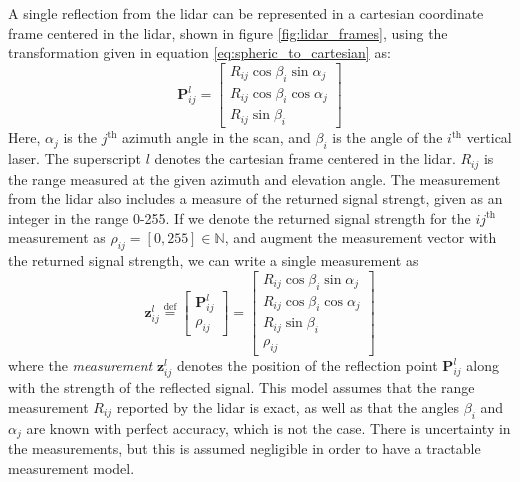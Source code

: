 A single reflection from the lidar can be represented in a cartesian coordinate frame centered in the lidar, shown in figure \ref{fig:lidar_frames}, using the transformation given in equation \ref{eq:spheric_to_cartesian} as:
\begin{equation}
\mathbf{P}^{l}_{ij}=\begin{bmatrix}
R_{ij}\cos{\beta_i}\sin{\alpha_j}\\
R_{ij}\cos{\beta_i}\cos{\alpha_j}\\
R_{ij}\sin{\beta_i}
\end{bmatrix}
\end{equation}
Here, $\alpha_j$ is the $j^{\text{th}}$ azimuth angle in the scan, and $\beta_i$ is the angle of the $i^{\text{th}}$ vertical laser. The superscript $l$ denotes the cartesian frame centered in the lidar. $R_{ij}$ is the range measured at the given azimuth and elevation angle. The measurement from the lidar also includes a measure of the returned signal strengt, given as an integer in the range 0-255. If we denote the returned signal strength for the $ij^{\text{th}}$ measurement as $\rho_{ij} = [0, 255]\in \mathbb{N}$, and augment the measurement vector with the returned signal strength, we can write a single measurement as
\begin{equation}
\mathbf{z}^l_{ij}\overset{\text{def}}{=}\begin{bmatrix}
\mathbf{P}^{l}_{ij}\\\rho_{ij}
\end{bmatrix}=\begin{bmatrix}
R_{ij}\cos{\beta_i}\sin{\alpha_j}\\
R_{ij}\cos{\beta_i}\cos{\alpha_j}\\
R_{ij}\sin{\beta_i}\\
\rho_{ij}
\end{bmatrix}
\end{equation}
where the \textit{measurement} $\mathbf{z}^l_{ij}$ denotes the position of the reflection point $\mathbf{P}^{l}_{ij}$ along with the strength of the reflected signal. This model assumes that the range measurement $R_{ij}$ reported by the lidar is exact, as well as that the angles $\beta_i$ and $\alpha_j$ are known with perfect accuracy, which is not the case. There is uncertainty in the measurements, but this is assumed negligible in order to have a tractable measurement model.

